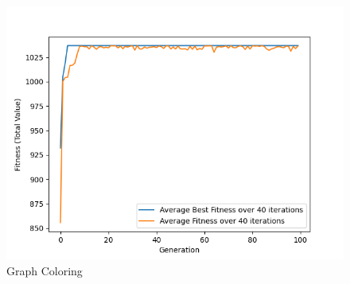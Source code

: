 \documentclass[11pt, letterpaper]{article}
\begin{document}
\begin{figure}[H]
  \includegraphics[width=\linewidth]{images/knapsack_rd_tr.png}
  \caption{Graph Coloring}
\endminipage
\end{figure}
\end{document}
